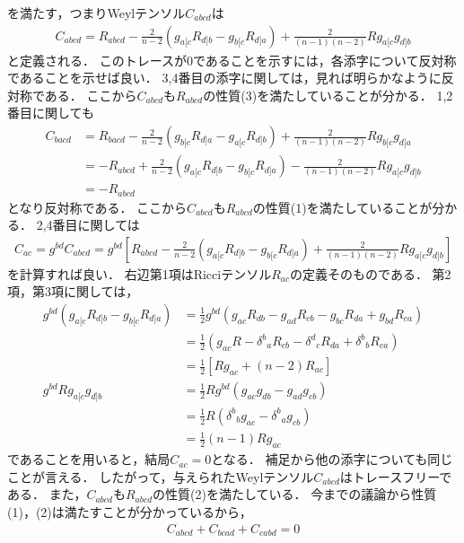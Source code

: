 \documentclass[a4paper]{jsarticle}
\begin{document}
を満たす，つまりWeylテンソル$C_{abcd}$は
\begin{align}
	C_{abcd} = R_{abcd} - \frac{2}{n-2} \left(
		g_{a[c} R_{d]b} - g_{b[c} R_{d]a}
	\right) + \frac{2}{(n-1)(n-2)} R g_{a[c} g_{d]b}
\end{align}
と定義される．
このトレースが0であることを示すには，各添字について反対称であることを示せば良い．
3,4番目の添字に関しては，見れば明らかなように反対称である．
ここから$C_{abcd}$も$R_{abcd}$の性質(3)を満たしていることが分かる．
1,2番目に関しても
\begin{align}
	C_{bacd} &= R_{bacd} - \frac{2}{n-2} \left(
		g_{b[c} R_{d]a} - g_{a[c} R_{d]b}
	\right) + \frac{2}{(n-1)(n-2)} R g_{b[c} g_{d]a} \\
	&= -R_{abcd} + \frac{2}{n-2} \left(
		g_{a[c} R_{d]b} - g_{b[c} R_{d]a}
	\right) - \frac{2}{(n-1)(n-2)} R g_{a[c} g_{d]b} \\
	&= - R_{abcd}
\end{align}
となり反対称である．
ここから$C_{abcd}$も$R_{abcd}$の性質(1)を満たしていることが分かる．
2,4番目に関しては
\begin{align}
	C_{ac} = g^{bd} C_{abcd} = g^{bd} \left[ R_{abcd} - \frac{2}{n-2} \left(
		g_{a[c} R_{d]b} - g_{b[c} R_{d]a}
		\right) + \frac{2}{(n-1)(n-2)} R g_{a[c} g_{d]b}
	\right]
\end{align}
を計算すれば良い．
右辺第1項はRicciテンソル$R_{ac}$の定義そのものである．
第2項，第3項に関しては，
\begin{align}
	g^{bd} \left( g_{a[c} R_{d]b} - g_{b[c} R_{d]a} \right)
	&= \frac{1}{2} g^{bd} \left(
		g_{ac} R_{db} - g_{ad} R_{cb} - g_{bc} R_{da} + g_{bd} R_{ca}
	\right) \\
	&= \frac{1}{2} \left(
		g_{ac} R - {\delta^b}_a R_{cb}
		- {\delta^d}_c R_{da} + {\delta^b}_b R_{ca}
	\right) \\
	&= \frac{1}{2} \left[ R g_{ac} + (n-2) R_{ac} \right] \\
	g^{bd} R g_{a[c} g_{d]b}
	&= \frac{1}{2} R g^{bd} \left( g_{ac} g_{db} - g_{ad} g_{cb} \right) \\
	&= \frac{1}{2} R \left( {\delta^b}_b g_{ac} - {\delta^b}_a g_{cb} \right) \\
	&= \frac{1}{2} (n-1) R g_{ac}
\end{align}
であることを用いると，結局$C_{ac}=0$となる．
補足から他の添字についても同じことが言える．
したがって，与えられたWeylテンソル$C_{abcd}$はトレースフリーである．
また，$C_{abcd}$も$R_{abcd}$の性質(2)を満たしている．
今までの議論から性質(1)，(2)は満たすことが分かっているから，
\begin{align}
	C_{abcd} + C_{bcad} + C_{cabd} = 0
\end{align}
\end{document}
